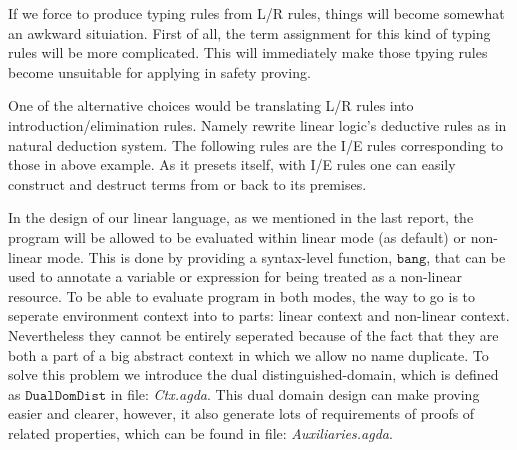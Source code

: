 \documentclass[a4paper,twocolumn]{article}
\begin{document}
\begin{prooftree}
\end{prooftree}
\begin{prooftree}
\end{prooftree}

If we force to produce typing rules from L/R rules, things will become somewhat an awkward situiation. First of all, the term assignment for this kind of typing rules will be more complicated. This will immediately make those tpying rules become unsuitable for applying in safety proving.

One of the alternative choices would be translating L/R rules into introduction/elimination rules. Namely rewrite linear logic's deductive rules as in natural deduction system. The following rules are the I/E rules corresponding to those in above example. As it presets itself, with I/E rules one can easily construct and destruct terms from or back to its premises.

\begin{prooftree}
\end{prooftree}
\begin{prooftree}
\end{prooftree}


In the design of our linear language, as we mentioned in the last report, the program will be allowed to be evaluated within linear mode (as default) or non-linear mode. This is done by providing a syntax-level function, $\mathtt{bang}$, that can be used to annotate a variable or expression for being treated as a non-linear resource. To be able to evaluate program in both modes, the way to go is to seperate environment context into to parts: linear context and non-linear context. Nevertheless they cannot be entirely seperated because of the fact that they are both a part of a big abstract context in which we allow no name duplicate. To solve this problem we introduce the dual distinguished-domain, which is defined as $\mathtt{DualDomDist}$ in file: \textit{Ctx.agda}\footnotemark[1]. This dual domain design can make proving easier and clearer, however, it also generate lots of requirements of proofs of related properties, which can be found in file: \textit{Auxiliaries.agda}\footnotemark[1].



\end{document}
